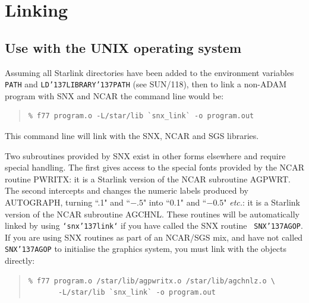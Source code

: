 \documentclass[11pt]{article}
\renewcommand{\_}{{\tt\char'137}}     %
\begin{document}
\section {Linking} \label{link_sect}

\subsection {Use with the UNIX operating system}

\begin{sloppypar} Assuming all Starlink directories have been added to
the environment variables {\tt PATH} and {\tt LD\_LIBRARY\_PATH} (see
SUN/118), then to link a non-ADAM program with SNX and NCAR the command
line would be:  \end{sloppypar}

\begin {quote}
\begin {small}
\begin{verbatim}
% f77 program.o -L/star/lib `snx_link` -o program.out
\end{verbatim}
\end {small}
\end {quote}

This command line will link with the SNX, NCAR and SGS libraries.

Two subroutines provided by SNX exist in other forms elsewhere and
require special handling.  The first gives access to the special fonts
provided by the NCAR routine PWRITX:  it is a Starlink version of the
NCAR subroutine AGPWRT.  The second intercepts and changes the numeric
labels produced by AUTOGRAPH, turning ``.1" and ``$-.5$" into ``0.1"
and ``$-0.5$" {\em etc.}: it is a Starlink version of the NCAR
subroutine AGCHNL.  These routines will be automatically linked by
using {\tt `snx\_link`} if you have called the SNX routine {\tt
SNX\_AGOP}.   If you are using SNX routines as part of an NCAR/SGS mix,
and have not called {\tt SNX\_AGOP} to initialise the graphics system,
you must link with the objects directly:

\begin {quote}
\begin {small}
\begin{verbatim}
% f77 program.o /star/lib/agpwritx.o /star/lib/agchnlz.o \
       -L/star/lib `snx_link` -o program.out
\end{verbatim}
\end {small}
\end {quote}
\end{document}
